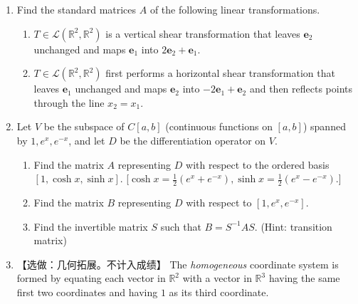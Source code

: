 \documentclass[a4paper,11pt]{article}
\newcommand{\re}{\mathbb{R}}
\begin{document}
\begin{enumerate}
For each of the following linear transformations \( L \) from \( \mathbb{R}^3 \) into \( \mathbb{R}^2 \), find the matrix representing \( L \) with respect to the ordered bases \( E \) and \( F \):

(i) \( L(x) = 
  \begin{pmatrix}
  x_1 + x_2 \\
  x_1 - x_3
  \end{pmatrix} \); \quad (ii) \( L(x) = 
  \begin{pmatrix}
  2x_2 \\
  -x_1
  \end{pmatrix} \).
 \vspace{15em}

      \item Find the standard matrices $A$ of the following linear transformations.
\begin{enumerate}
  \item $T\in\mathcal{L}(\re^2,\re^2)$ is a vertical shear transformation that leaves $\mathbf{e}_2$ unchanged and maps $\mathbf{e}_1$ into $2\mathbf{e}_2+\mathbf{e}_1$.
  \item $T\in\mathcal{L}(\re^2,\re^2)$ first performs a horizontal shear transformation that leaves $\mathbf{e}_1$ unchanged and maps $\mathbf{e}_2$ into $-2\mathbf{e}_1+\mathbf{e}_2$ and then reflects points through the line $x_2=x_1$.
\end{enumerate}
\vspace{16em}
\item Let $V$ be the subspace of $C[a, b]$ (continuous functions on $[a, b]$) spanned by
      $1, e^x, e^{-x}$, and let $D$ be the differentiation operator
      on $V$.
  \begin{enumerate}
    \item Find the matrix $A$ representing $D$ with respect to the ordered basis 
    $[1, \cosh x, \sinh x]$. [$\cosh x = \frac12 (e^x + e^{-x}), \sinh x = \frac12(e^x - e^{-x})$.]
    \item  Find the matrix $B$ representing $D$ with respect
      to $[1, e^x, e^{-x}]$.
    \item Find the invertible matrix $S$ such that $B = S^{-1}AS$. (Hint: transition matrix)
  \end{enumerate}
  \newpage
      \item 【选做：几何拓展。不计入成绩】
      The {\it homogeneous} coordinate system is formed by equating each vector in $\re^2$ with a
vector in $\re^3$ having the same first two coordinates and having $1$ as its third coordinate.

\end{enumerate}
\end{document}

